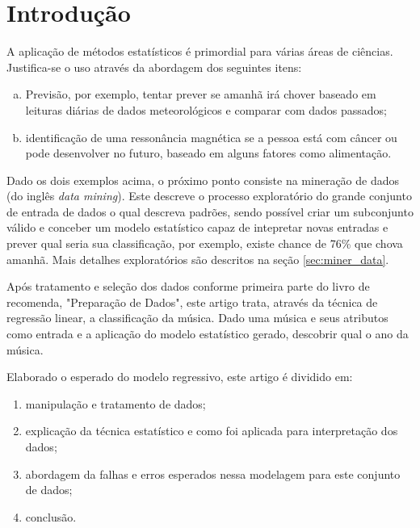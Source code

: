\documentclass[journal]{IEEEtran}
\begin{document}
\IEEEpeerreviewmaketitle

\section{Introdução}

A aplicação de métodos estatísticos é primordial para várias áreas de ciências. Justifica-se o uso através da abordagem dos seguintes itens: 

\begin{enumerate}[(a)]
\item Previsão, por exemplo, tentar prever se amanhã irá chover baseado em leituras diárias de dados meteorológicos e comparar com dados passados;
\item identificação de uma ressonância magnética se a pessoa está com câncer ou pode desenvolver no futuro, baseado em alguns fatores como alimentação.
\end{enumerate}

Dado os dois exemplos acima, o próximo ponto consiste na mineração de dados (do inglês \textit{data mining}). Este descreve o processo exploratório do grande conjunto de entrada de dados o qual descreva padrões, sendo possível criar um subconjunto válido e conceber um modelo estatístico capaz de intepretar novas entradas e prever qual seria sua classificação, por exemplo, existe chance de 76\% que chova amanhã. Mais detalhes exploratórios são descritos na seção \ref{sec:miner_data}.

Após tratamento e seleção dos dados conforme primeira parte do livro de \citeauthor{carvalhointeligencia} recomenda, "Preparação de Dados", este artigo trata, através da técnica de regressão linear, a classificação da música. Dado uma música e seus atributos como entrada e a aplicação do modelo estatístico gerado, descobrir qual o ano da música.

Elaborado o esperado do modelo regressivo, este artigo é dividido em: 

\begin{enumerate}
\item manipulação e tratamento de dados;
\item explicação da técnica estatístico e como foi aplicada para interpretação dos dados;
\item abordagem da falhas e erros esperados nessa modelagem para este conjunto de dados;
\item conclusão.
\end{enumerate}
\end{document}
